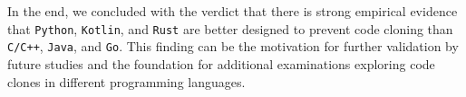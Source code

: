 In the end, we concluded with the verdict that there is strong empirical evidence that \texttt{Python}, \texttt{Kotlin}, and \texttt{Rust} are better designed to prevent code cloning than \texttt{C/C++}, \texttt{Java}, and \texttt{Go}. This finding can be the motivation for further validation by future studies and the foundation for additional examinations exploring code clones in different programming languages.